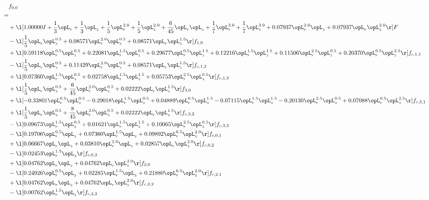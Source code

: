 \begin{alignat}{2} 
\label{eq:f_00_2} 
& f_{0,0} \nonumber \\ 
 = \\ 
& + \l[  1.00000 I + \frac{1}{3} \opL_r + \frac{1}{3} \opL_z + \frac{1}{5} \opL_r^{2.0} + \frac{1}{5} \opL_z^{2.0} + \frac{6}{45} \opL_r \opL_z + \frac{1}{7} \opL_r^{3.0} + \frac{1}{7} \opL_z^{3.0} +  0.07937 \opL_r^{2.0} \opL_z +  0.07937 \opL_r \opL_z^{2.0}  \r] F \nonumber \\ 
& - \l[ \frac{1}{5} \opL_r \opL_z^{0.5} +  0.08571 \opL_r^{2.0} \opL_z^{0.5} +  0.08571 \opL_r \opL_z^{1.5}  \r] f_{1,0} \nonumber \\ 
& + \l[  0.59118 \opL_r^{0.5} \opL_z^{0.5} +  0.22081 \opL_r^{1.5} \opL_z^{0.5} +  0.29677 \opL_r^{0.5} \opL_z^{1.5} +  0.12216 \opL_r^{1.5} \opL_z^{1.5} +  0.11506 \opL_r^{2.5} \opL_z^{0.5} +  0.20370 \opL_r^{0.5} \opL_z^{2.5}  \r] f_{c,1,1} \nonumber \\ 
& - \l[ \frac{1}{5} \opL_r \opL_z^{0.5} +  0.11429 \opL_r^{2.0} \opL_z^{0.5} +  0.08571 \opL_r \opL_z^{1.5}  \r] f_{c,1,2} \nonumber \\ 
& + \l[  0.07360 \opL_r^{1.5} \opL_z^{0.5} +  0.02758 \opL_r^{1.5} \opL_z^{1.5} +  0.05753 \opL_r^{2.5} \opL_z^{0.5}  \r] f_{c,1,3} \nonumber \\ 
& + \l[ \frac{1}{5} \opL_r \opL_z^{0.5} + \frac{6}{45} \opL_r^{2.0} \opL_z^{0.5} +  0.02222 \opL_r \opL_z^{1.5}  \r] f_{3,0} \nonumber \\ 
& + \l[  -0.33801 \opL_r^{0.5} \opL_z^{0.5}   -0.29018 \opL_r^{1.5} \opL_z^{0.5} +  0.04889 \opL_r^{0.5} \opL_z^{1.5}   -0.07115 \opL_r^{1.5} \opL_z^{1.5}   -0.20130 \opL_r^{2.5} \opL_z^{0.5} +  0.07088 \opL_r^{0.5} \opL_z^{2.5}  \r] f_{c,3,1} \nonumber \\ 
& + \l[ \frac{1}{5} \opL_r \opL_z^{0.5} + \frac{8}{45} \opL_r^{2.0} \opL_z^{0.5} +  0.02222 \opL_r \opL_z^{1.5}  \r] f_{c,3,2} \nonumber \\ 
& - \l[  0.09673 \opL_r^{1.5} \opL_z^{0.5} +  0.01621 \opL_r^{1.5} \opL_z^{1.5} +  0.10065 \opL_r^{2.5} \opL_z^{0.5}  \r] f_{c,3,3} \nonumber \\ 
& - \l[  0.19706 \opL_r^{0.5} \opL_z +  0.07360 \opL_r^{1.5} \opL_z +  0.09892 \opL_r^{0.5} \opL_z^{2.0}  \r] f_{c,0,1} \nonumber \\ 
& + \l[  0.06667 \opL_r \opL_z +  0.03810 \opL_r^{2.0} \opL_z +  0.02857 \opL_r \opL_z^{2.0}  \r] f_{c,0,2} \nonumber \\ 
& - \l[  0.02453 \opL_r^{1.5} \opL_z  \r] f_{c,0,3} \nonumber \\ 
& + \l[  0.04762 \opL_r \opL_z +  0.04762 \opL_r \opL_z^{2.0}  \r] f_{2,0} \nonumber \\ 
& - \l[  0.24926 \opL_r^{0.5} \opL_z +  0.02285 \opL_r^{1.5} \opL_z +  0.21880 \opL_r^{0.5} \opL_z^{2.0}  \r] f_{c,2,1} \nonumber \\ 
& + \l[  0.04762 \opL_r \opL_z +  0.04762 \opL_r \opL_z^{2.0}  \r] f_{c,2,2} \nonumber \\ 
& - \l[  0.00762 \opL_r^{1.5} \opL_z  \r] f_{c,2,3} \nonumber \\ 
\end{alignat} 



